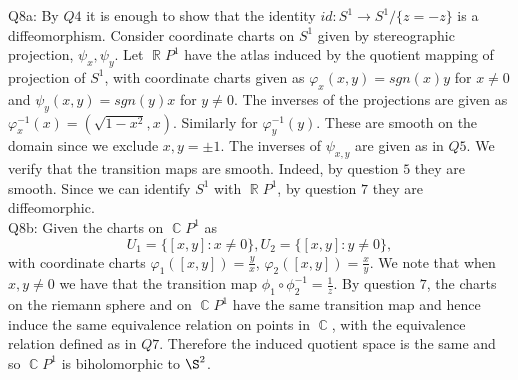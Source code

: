 \documentclass[letterpaper]{article}
\DeclareMathOperator{\R}{\mathbb{R}}
\DeclareMathOperator{\C}{\mathbb{C}}
\begin{document}
 
\noindent Q8a: 
By $Q4$ it is enough to show that the identity $id: S^1 \to S^1/\{z=-z\}$ is a diffeomorphism.
Consider coordinate charts on $S^1$ given by stereographic projection, $\psi_x, \psi_y$. 
Let $\R P^1$ have the atlas induced by the quotient mapping of projection of $S^1$, with 
coordinate charts given as $\varphi_x (x,y) = sgn(x)y$ for $x\neq 0$ and $\psi_y(x,y) = sgn(y)x$ for $y\neq 0$.
The inverses of the projections are given as $\varphi_x^{-1}(x) = (\sqrt{1-x^2}, x)$. Similarly for $\varphi_y^{-1}(y)$.
These are smooth on the domain since we exclude $x,y = \pm 1$. 
The inverses of $\psi_{x,y}$ are given as in $Q5$. We verify that the transition maps are smooth. Indeed, 
by question $5$ they are smooth. Since we can identify $S^1$ with $\R P^1$, by question $7$ they are diffeomorphic. 
\newline \\ Q8b: Given the charts on $\C P^1$ as $$U_1= \{[x,y] : x \neq 0\}, U_2 = \{[x,y] : y \neq 0 \},$$ 
with coordinate charts $\varphi_1([x,y]) = \frac{y}{x}$, $\varphi_2([x,y]) = \frac{x}{y}$. We note that when $x,y\neq 0$ we have that the transition map $\phi_1 \circ \phi_2^{-1}= \frac{1}{z}$. 
By question $7$, the charts on the riemann sphere and on $\C P^1$ have the same transition map and hence induce the same equivalence relation on points in $\C$, with the
equivalence relation defined as in $Q7$. Therefore the induced quotient space is the same and so $\C P^1$ is biholomorphic to $\S^2$.  
\end{document}
